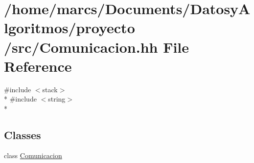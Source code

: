 \hypertarget{_comunicacion_8hh}{\section{/home/marcs/\-Documents/\-Datosy\-Algoritmos/proyecto /src/\-Comunicacion.hh File Reference}
\label{_comunicacion_8hh}
}
{\ttfamily \#include $<$stack$>$}\\*
{\ttfamily \#include $<$string$>$}\\*
\subsection*{Classes}
\begin{DoxyCompactItemize}
\item 
class \hyperlink{class_comunicacion}{Comunicacion}
\end{DoxyCompactItemize}
